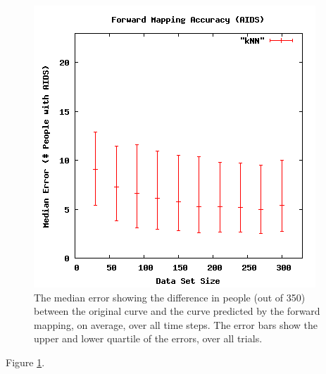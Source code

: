 \begin{figure}[ht]
\centering
\includegraphics[scale=.5]{images/results_aids/aids-fmacc.png}
\caption{The median error showing the difference in people  (out of 350) between the original curve and the curve predicted by the forward mapping, on average, over all time steps.
The error bars show the upper and lower quartile of the errors, over all trials.}
\label{fig:aidsfmacc}
\end{figure}

Figure \ref{fig:aidsfmacc}.


